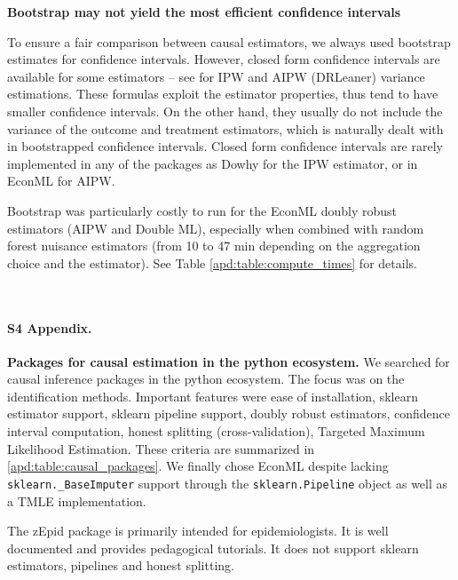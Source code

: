 \documentclass[10pt,letterpaper]{article}
\begin{document}
\textbf{Bootstrap may not yield the most efficient confidence intervals}

To ensure a fair comparison between causal estimators, we always used
bootstrap estimates for confidence intervals. However, closed form
confidence intervals are available for some estimators -- see \cite{wager2020stats}
for IPW and AIPW (DRLeaner) variance estimations. These formulas exploit the
estimator properties, thus tend to have smaller confidence intervals. On the
other hand, they usually do not include the variance of the outcome and
treatment estimators, which is naturally dealt with in bootstrapped confidence
intervals. Closed form confidence intervals are rarely implemented in any of the
packages as Dowhy for the IPW estimator, or in EconML for AIPW.

Bootstrap was particularly costly to run for the EconML doubly robust
estimators (AIPW and Double ML), especially when combined with random forest nuisance
estimators (from 10 to 47 min depending on the aggregation choice and the
estimator). See Table \ref{apd:table:compute_times} for details.

\begin{table}[]
  \centering\small
  
  \\
  \caption{Compute times for the different estimation methods with 50 bootstrap replicates.}\label{apd:table:compute_times}
\end{table}
\clearpage


\paragraph*{S4 Appendix.}
\label{apd:packages}
{\bf Packages for causal estimation in the python ecosystem.}
We searched for causal inference packages in the python ecosystem. The focus
was on the identification methods. Important features were ease of
installation, sklearn estimator support, sklearn pipeline support, doubly
robust estimators, confidence interval computation, honest splitting
(cross-validation), Targeted Maximum Likelihood Estimation. These criteria are
summarized in \ref{apd:table:causal_packages}. We finally chose EconML despite
lacking \texttt{sklearn.\_BaseImputer} support through the
\texttt{sklearn.Pipeline} object as well as a TMLE implementation.

The zEpid package is primarily intended for epidemiologists. It is well documented
and provides pedagogical tutorials. It does not support sklearn estimators,
pipelines and honest splitting.
\end{document}
